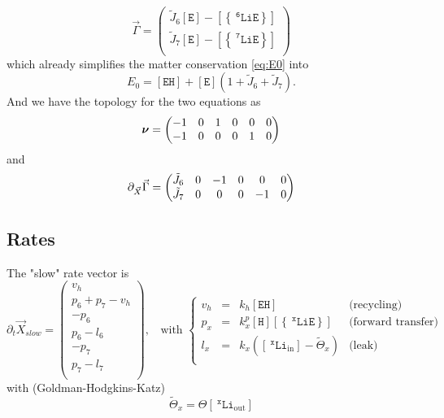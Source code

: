 \documentclass[aps,onecolumn,12pt]{revtex4}
\newcommand{\mychem}[1]{\mathtt{#1}}
\newcommand{\myconc}[1]{\left\lbrack{#1}\right\rbrack}
\newcommand{\spLi}[1]{{~^{\mychem{#1}}\mychem{Li}}}
\newcommand{\spEout}{\mychem{E}}
\newcommand{\Eout}{\myconc{\spEout}}
\newcommand{\spLiE}[1]{\left\lbrace\spLi{#1}\spEout\right\rbrace}
\newcommand{\LiE}[1]{\myconc{\spLiE{#1}}}
\newcommand{\spLiIn}[1]{{\spLi{#1}}_{\mathrm{in}}}
\newcommand{\LiIn}[1]{\myconc{\spLiIn{#1}}}
\newcommand{\spLiOut}[1]{{\spLi{#1}}_{\mathrm{out}}}
\newcommand{\LiOut}[1]{\myconc{\spLiOut{#1}}}
\newcommand{\spEHin}{\mychem{EH}}
\newcommand{\EHin}{\myconc{\spEHin}}
\newcommand{\spproton}{\mychem{H}}
\newcommand{\proton}{\myconc{\spproton}}
\newcommand{\mymat}[1]{{\bm{#1}}}
\begin{document}
\begin{equation}
\vec{\Gamma} = 
\begin{pmatrix}
	\tilde{J}_6 \Eout - \LiE{6} \\
	\tilde{J}_7 \Eout - \LiE{7} \\
\end{pmatrix}
\end{equation}
which already simplifies the matter conservation \eqref{eq:E0} into
\begin{equation}
	E_0 = \EHin + \Eout \left(1+\tilde{J}_6+\tilde{J}_7\right).
\end{equation}
And we have the topology for the two equations as
\begin{equation}
	\label{eq:Nu}
	\mymat{\nu}=\begin{pmatrix}-1 & 0 & 1 & 0 & 0 & 0\cr -1 & 0 & 0 & 0 & 1 & 0\end{pmatrix}
\end{equation}
and
\begin{equation}
	\partial_{\vec{X}}\vec{\Gamma} = 
	\begin{pmatrix}\tilde{J}_6 & 0 & -1 & 0 & 0 & 0\cr\tilde{J}_7 & 0 & 0 & 0 & -1 & 0\end{pmatrix}
\end{equation}

\subsection{Rates}

The "slow" rate vector is
\begin{equation}
	\partial_t\vec{X}_{slow} = 
	\begin{pmatrix}
		v_h\\
		p_6+p_7-v_h\\
		-p_6\\
		p_6-l_6\\
		-p_7\\
		p_7-l_7\\
	\end{pmatrix}
	,\;\;\text{ with }
	\left\lbrace
	\begin{array}{rcll}
	v_h & = & k_h \EHin & \text{(recycling)}\\
	p_x & = & k_x^p \proton \LiE{x} & \text{(forward transfer)}\\
	l_x & = & k_x  \left(\LiIn{x}-\tilde{\Theta}_x\right) & \text{(leak)}\\
	\end{array}
	\right.
\end{equation}
with (Goldman-Hodgkins-Katz)
\begin{equation}
	\tilde{\Theta}_x = \Theta \LiOut{x}
\end{equation}
\end{document}
